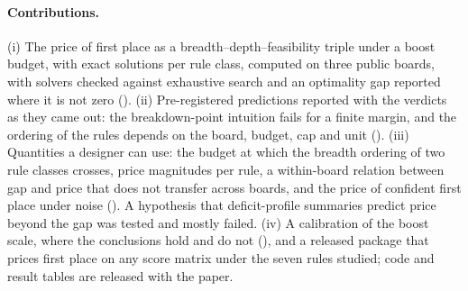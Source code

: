 \paragraph{Contributions.}
(i) The price of first place as a breadth--depth--feasibility triple under a boost budget, with exact solutions per rule class, computed on three public boards, with solvers checked against exhaustive search and an optimality gap reported where it is not zero (). (ii) Pre-registered predictions reported with the verdicts as they came out: the breakdown-point intuition fails for a finite margin, and the ordering of the rules depends on the board, budget, cap and unit (). (iii) Quantities a designer can use: the budget at which the breadth ordering of two rule classes crosses, price magnitudes per rule, a within-board relation between gap and price that does not transfer across boards, and the price of confident first place under noise (). A hypothesis that deficit-profile summaries predict price beyond the gap was tested and mostly failed. (iv) A calibration of the boost scale, where the conclusions hold and do not (), and a released package that prices first place on any score matrix under the seven rules studied; code and result tables are released with the paper.

